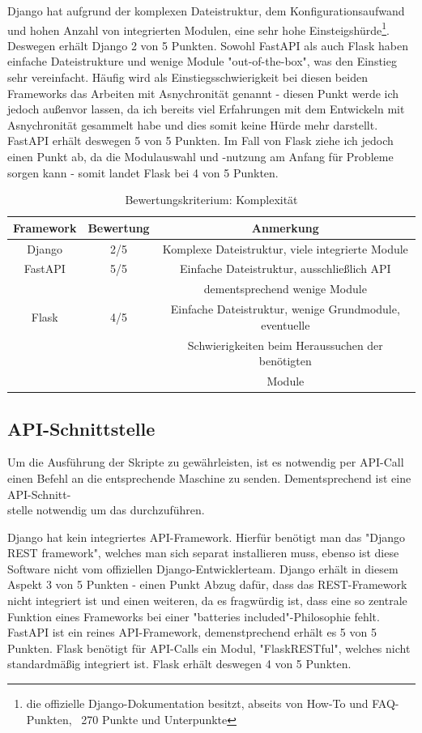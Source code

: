 \documentclass[letterpaper,11pt,leqno]{article}
\begin{document}
Django hat aufgrund der komplexen Dateistruktur, dem Konfigurationsaufwand und
hohen Anzahl von integrierten Modulen, eine sehr hohe Einsteigshürde\footnote{die offizielle Django-Dokumentation besitzt, abseits
von How-To und FAQ-Punkten, ~270 Punkte und Unterpunkte}. Deswegen erhält Django 2 von 5 Punkten. Sowohl FastAPI als auch Flask
haben einfache Dateistrukture und wenige Module "out-of-the-box", was den Einstieg sehr vereinfacht. Häufig wird als
Einstiegsschwierigkeit bei diesen beiden Frameworks das Arbeiten mit Asnychronität genannt - diesen Punkt werde ich jedoch außenvor
lassen, da ich bereits viel Erfahrungen mit dem Entwickeln mit Asnychronität gesammelt habe und dies somit keine Hürde mehr
darstellt. FastAPI erhält deswegen 5 von 5 Punkten. Im Fall von Flask ziehe ich jedoch einen Punkt ab, da die Modulauswahl und
-nutzung am Anfang für Probleme sorgen kann - somit landet Flask bei 4 von 5 Punkten.
\begin{table}[h!]
	\begin{center}
		\begin{tabular}{|c||c|c|}
			\hline
			Framework & Bewertung & Anmerkung\\
			\hline\hline
			Django & 2/5 & Komplexe Dateistruktur, viele integrierte Module\\
			FastAPI & 5/5 & Einfache Dateistruktur, ausschließlich API\\
			& & dementsprechend wenige Module\\
			Flask & 4/5 & Einfache Dateistruktur, wenige Grundmodule, eventuelle\\
			& & Schwierigkeiten beim Heraussuchen der benötigten\\
			& & Module\\
			\hline
		\end{tabular}
		\caption{Bewertungskriterium: Komplexität}
	\end{center}
	\label{table:4}
\end{table}

\subsection{API-Schnittstelle}
Um die Ausführung der Skripte zu gewährleisten, ist es notwendig per API-Call einen Befehl an die entsprechende Maschine zu senden.
Dementsprechend ist eine API-Schnitt-\\stelle notwendig um das durchzuführen.

Django hat kein integriertes API-Framework. Hierfür benötigt man das "Django REST framework", welches man sich separat installieren
muss, ebenso ist diese Software nicht vom offiziellen Django-Entwicklerteam. Django erhält in diesem Aspekt 3 von 5 Punkten - einen
Punkt Abzug dafür, dass das REST-Framework nicht integriert ist und einen weiteren, da es fragwürdig ist, dass eine so zentrale
Funktion eines Frameworks bei einer "batteries included"-Philosophie fehlt. FastAPI ist ein reines API-Framework, demenstprechend
erhält es 5 von 5 Punkten. Flask benötigt für API-Calls ein Modul,  "FlaskRESTful", welches nicht standardmäßig integriert ist.
Flask erhält deswegen 4 von 5 Punkten. 
\end{document}

